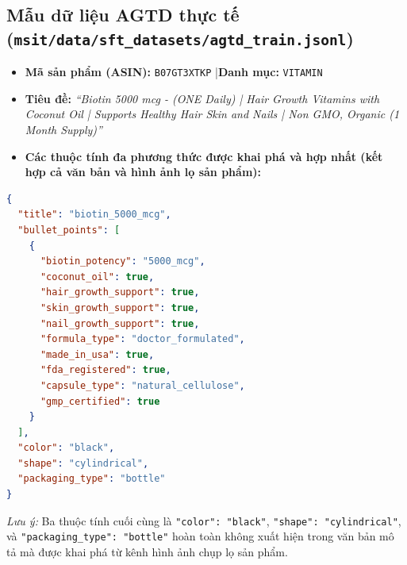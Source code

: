 \documentclass[conference,10pt]{IEEEtran}
\begin{document}
\subsection{Mẫu dữ liệu AGTD thực tế (\texttt{msit/data/sft\_datasets/agtd\_train.jsonl})}
\begin{itemize}
    \item \textbf{Mã sản phẩm (ASIN):} \texttt{B07GT3XTKP} \quad|\quad \textbf{Danh mục:} \texttt{VITAMIN}
    \item \textbf{Tiêu đề:} \textit{``Biotin 5000 mcg - (ONE Daily) | Hair Growth Vitamins with Coconut Oil | Supports Healthy Hair Skin and Nails | Non GMO, Organic (1 Month Supply)''}
    \item \textbf{Các thuộc tính đa phương thức được khai phá và hợp nhất (kết hợp cả văn bản và hình ảnh lọ sản phẩm):}
\end{itemize}

\begin{lstlisting}[language=json]
{
  "title": "biotin_5000_mcg",
  "bullet_points": [
    {
      "biotin_potency": "5000_mcg",
      "coconut_oil": true,
      "hair_growth_support": true,
      "skin_growth_support": true,
      "nail_growth_support": true,
      "formula_type": "doctor_formulated",
      "made_in_usa": true,
      "fda_registered": true,
      "capsule_type": "natural_cellulose",
      "gmp_certified": true
    }
  ],
  "color": "black",
  "shape": "cylindrical",
  "packaging_type": "bottle"
}
\end{lstlisting}

\textit{Lưu ý:} Ba thuộc tính cuối cùng là \texttt{"color": "black"}, \texttt{"shape": "cylindrical"}, và \texttt{"packaging\_type": "bottle"} hoàn toàn không xuất hiện trong văn bản mô tả mà được khai phá từ kênh hình ảnh chụp lọ sản phẩm.
\end{document}
